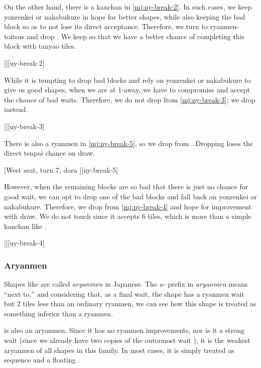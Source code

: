 \documentclass[12pt]{article}
\begin{document}
On the other hand, there is a  kanchan in \ref{mj:ny-break-2}. In such cases, we keep yonrenkei or nakabukure in hope for better shapes, while also keeping the bad block so as to not lose its direct acceptance. Therefore, we turn to ryanmen-toitsus and drop . We keep  so that we have a better chance of completing this block with tanyao tiles.

[][ny-break-2]

While it is tempting to drop bad blocks and rely on yonrenkei or nakabukure to give us good shapes, when we are at 1-away, we have to compromise and accept the chance of bad waits. Therefore, we do not drop  from \ref{mj:ny-break-3}; we drop  instead.

[][ny-break-3]

There is also a  ryanmen in \ref{mj:ny-break-5}, so we drop  from  \citep[][pp.~99--100]{ooi-gundou}. Dropping  loses the direct tenpai chance on  draw.

[West seat, turn 7, dora ][ny-break-5]

However, when the remaining blocks are so bad that there is just no chance for good wait, we can opt to drop one of the bad blocks and fall back on yonrenkei or nakabukure. Therefore, we drop  from \ref{mj:ny-break-4} and hope for improvement with  draw. We do not touch  since it accepts  6 tiles, which is more than a simple kanchan like  \citep{clearrain-nkbkr-yrk}.

[][ny-break-4]


\subsubsection{Aryanmen}

Shapes like  are called \textit{aryanmen} in Japanese. The \textit{a-} prefix in \textit{aryanmen} means ``next to,'' and considering that, as a final wait, the shape has a ryanmen wait but 2 tiles less than an ordinary ryanmen, we can see how this shape is treated as something inferior than a ryanmen.

 is also an aryanmen. Since it has no ryanmen improvements, nor is it a strong wait (since we already have two copies of the outermost wait ), it is the weakest aryanmen of all shapes in this family. In most cases, it is simply treated as  sequence and a floating .
\end{document}
